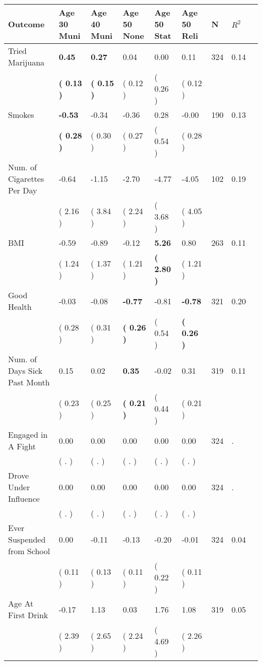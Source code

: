 \begin{tabular}{L{6.2cm} C{1.8cm} C{1.8cm} C{1.8cm} C{1.8cm} C{1.8cm} C{1.8cm} C{0.3cm} C{0.3cm}}
\toprule
 \textbf{Outcome} & \textbf{Age 30 Muni} & \textbf{Age 40 Muni} & \textbf{Age 50 None} & \textbf{Age 50 Stat} & \textbf{Age 50 Reli} & \textbf{N} & \textbf{$ R^2$} \\
\midrule
Tried Marijuana & \textbf{     0.45} & \textbf{     0.27} &      0.04 &      0.00 &      0.11  & 324 &       0.14 \\ 
 & \textbf{(     0.13 )} & \textbf{(     0.15 )} & (     0.12 ) & (     0.26 ) & (     0.12 )  & \\
Smokes & \textbf{    -0.53} &     -0.34 &     -0.36 &      0.28 &     -0.00  & 190 &       0.13 \\ 
 & \textbf{(     0.28 )} & (     0.30 ) & (     0.27 ) & (     0.54 ) & (     0.28 )  & \\
Num. of Cigarettes Per Day &     -0.64 &     -1.15 &     -2.70 &     -4.77 &     -4.05  & 102 &       0.19 \\ 
 & (     2.16 ) & (     3.84 ) & (     2.24 ) & (     3.68 ) & (     4.05 )  & \\
BMI &     -0.59 &     -0.89 &     -0.12 & \textbf{     5.26} &      0.80  & 263 &       0.11 \\ 
 & (     1.24 ) & (     1.37 ) & (     1.21 ) & \textbf{(     2.80 )} & (     1.21 )  & \\
Good Health &     -0.03 &     -0.08 & \textbf{    -0.77} &     -0.81 & \textbf{    -0.78}  & 321 &       0.20 \\ 
 & (     0.28 ) & (     0.31 ) & \textbf{(     0.26 )} & (     0.54 ) & \textbf{(     0.26 )}  & \\
Num. of Days Sick Past Month &      0.15 &      0.02 & \textbf{     0.35} &     -0.02 &      0.31  & 319 &       0.11 \\ 
 & (     0.23 ) & (     0.25 ) & \textbf{(     0.21 )} & (     0.44 ) & (     0.21 )  & \\
Engaged in A Fight &      0.00 &      0.00 &      0.00 &      0.00 &      0.00  & 324 &          . \\ 
 & (        . ) & (        . ) & (        . ) & (        . ) & (        . )  & \\
Drove Under Influence &      0.00 &      0.00 &      0.00 &      0.00 &      0.00  & 324 &          . \\ 
 & (        . ) & (        . ) & (        . ) & (        . ) & (        . )  & \\
Ever Suspended from School &      0.00 &     -0.11 &     -0.13 &     -0.20 &     -0.01  & 324 &       0.04 \\ 
 & (     0.11 ) & (     0.13 ) & (     0.11 ) & (     0.22 ) & (     0.11 )  & \\
Age At First Drink &     -0.17 &      1.13 &      0.03 &      1.76 &      1.08  & 319 &       0.05 \\ 
 & (     2.39 ) & (     2.65 ) & (     2.24 ) & (     4.69 ) & (     2.26 )  & \\
\bottomrule
\end{tabular}
